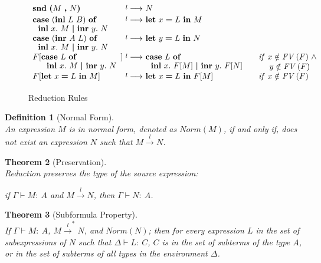 \documentclass[11p,a4paper]{article}
\makeatletter
\newcommand{\typecolor}{}
\newcommand{\termcolor}{}
\newcommand{\tp}[1]{{\typecolor #1}}
\newcommand{\tm}[1]{{\termcolor #1}}
\newtheorem{theorem}{Theorem}
\newtheorem{definition}[theorem]{Definition}
\newcommand{\expshr}[3]{\mathbf{let}\ #1\boldsymbol{=}#2\ \mathbf{in}\ #3}
\newcommand{\expshrind}[3]{\begin{array}[t]{@{}l}\mathbf{let}\ #1\boldsymbol{=}#2\\ \mathbf{in}\ \ #3\end{array}}
\newcommand{\expprd}[2]{\boldsymbol{(}#1\ \boldsymbol{,}\ #2\boldsymbol{)}}
\newcommand{\expsnd}[1]{\mathbf{snd}\ #1}
\newcommand{\explft}[2]{\mathbf{inl}\ #1\ #2}
\newcommand{\exprgt}[2]{\mathbf{inr}\ #1\ #2}
\newcommand{\expcas}[5]{\mathbf{case}\ #1\ \mathbf{of}\ \mathbf{inl}\ #2.\ #3\ \boldsymbol{|}\ \mathbf{inr}\ #4.\ #5}
\newcommand{\expcasind}[5]{\begin{array}[t]{@{}l}\mathbf{case}\ #1\ \mathbf{of}\\[-1pt] \ \ \mathbf{inl}\ #2.\ #3\ \boldsymbol{|}\ \mathbf{inr}\ #4.\ #5\end{array}}
\newcommand{\expcasindind}[5]{\begin{array}[t]{@{}l}\mathbf{case}\ #1\ \mathbf{of}\\[-1pt] \ \ \ \ \mathbf{inl}\ #2.\ #3\ \\[-1pt] \ \ \boldsymbol{|}\ \mathbf{inr}\ #4.\ #5\end{array}}
\newcommand{\env}{\tp{\Gamma}}
\newcommand{\typing}[2]{\tm{#1:\ }\tp{#2}}
\newcommand{\fv}[1]{\txt{FV}\,(#1)}
\newcommand{\txt}[1]{\text{\emph{#1}}}
\newcommand{\reduce}[3]{#1 \overset{#2}\longrightarrow #3}
\newcommand{\reducestar}[3]{#1 \overset{#2}\longrightarrow^* #3}
\newcommand{\cnd}[1]{\begin{array}[t]{l}\txt{if}\ #1\end{array}}
\makeatother
\begin{document}
\begin{figure*}[h]
\[\begin{array}[t]{l@{\ \reduce{}{l}{}\ }ll}
\expsnd{\expprd{M}{N}} 
& N                                               
& \\[2pt]


 
\expcasind{(\explft{L}{B})}{x}{M}{y}{N}
& \expshr{x}{L}{M}                             
& \\[2pt]
 
\expcasind{(\exprgt{A}{L})}{x}{M}{y}{N}
& \expshr{y}{L}{N}                             
& \\[2pt]

 

F[\expcasind{L}{x}{M}{y}{N}]
& \expcasind{L}{x}{F[M]}{y}{F[N]}
& \cnd{x \notin \fv{F}\ \wedge \\ \ \ \ \ y \notin \fv{F}}  \\[2pt]

F[\expshr{x}{L}{M}]
& \expshr{x}{L}{F[M]} 
& \cnd{x \notin \fv{F}} \\[2pt]

\end{array}
\]
\caption{Reduction Rules}
\label{fig:red}
\end{figure*} 

\begin{definition}[Normal Form]\ \\
An expression $M$ is in normal form, denoted as $Norm(M)$, if and only
if, does not exist an expression $N$ such that $\reduce{M}{l}{N}$.
\end{definition}

\begin{theorem}[Preservation]\ \\
Reduction preserves the type of the source expression:
 
 if $\env \vdash \typing{M}{A}$ and $\reduce{M}{l}{N}$, then 
$\env \vdash \typing{N}{A}$.
\end{theorem}

\begin{theorem}[Subformula Property]\ \\
If $\Gamma \vdash \typing{M}{A}$, $\reducestar{M}{l}{N}$, and $Norm(N)$;
then for every expression $L$ in the set of subexpressions of $N$ such
that $\Delta \vdash \typing{L}{C}$, $C$ is in the set of subterms of
the type $A$, or in the set of subterms of all types in the
environment $\Delta$.
\end{theorem}
 
\end{document}
